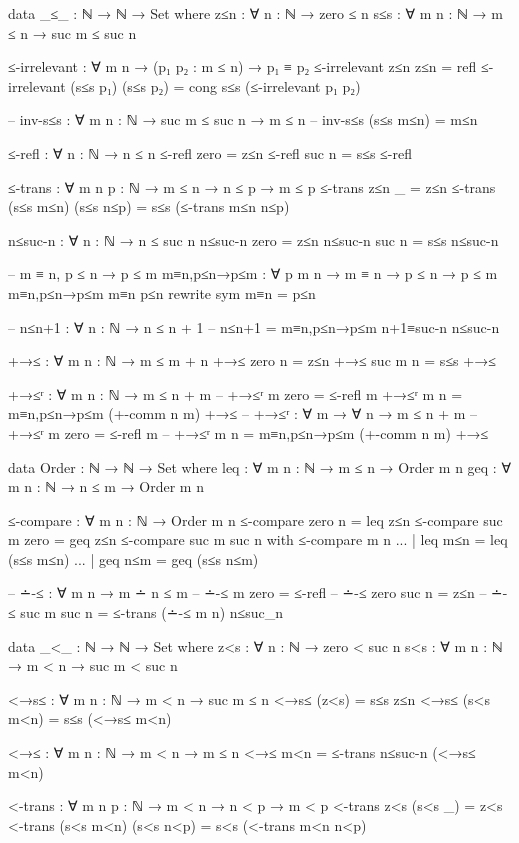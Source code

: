 \documentclass{article}
\begin{document}
\begin{prev}
\begin{code}
data _≤_ : ℕ → ℕ → Set where
    z≤n : ∀ {n : ℕ} → zero ≤ n
    s≤s : ∀ {m n : ℕ} → m ≤ n → suc m ≤ suc n

≤-irrelevant : ∀ {m n} → (p₁ p₂ : m ≤ n) → p₁ ≡ p₂
≤-irrelevant z≤n z≤n = refl
≤-irrelevant (s≤s p₁) (s≤s p₂) = cong s≤s (≤-irrelevant p₁ p₂)

-- inv-s≤s : ∀ {m n : ℕ} → suc m ≤ suc n → m ≤ n
-- inv-s≤s (s≤s m≤n) = m≤n

≤-refl : ∀ {n : ℕ} → n ≤ n
≤-refl {zero} = z≤n
≤-refl {suc n} = s≤s ≤-refl

≤-trans : ∀ {m n p : ℕ} → m ≤ n → n ≤ p → m ≤ p
≤-trans z≤n _ = z≤n
≤-trans (s≤s m≤n) (s≤s n≤p) = s≤s (≤-trans m≤n n≤p)

n≤suc-n : ∀ {n : ℕ} → n ≤ suc n
n≤suc-n {zero} = z≤n
n≤suc-n {suc n} = s≤s n≤suc-n

-- m ≡ n, p ≤ n → p ≤ m
m≡n,p≤n→p≤m : ∀ {p m n} → m ≡ n → p ≤ n → p ≤ m
m≡n,p≤n→p≤m m≡n p≤n rewrite sym m≡n = p≤n

-- n≤n+1 : ∀ {n : ℕ} → n ≤ n + 1
-- n≤n+1 = m≡n,p≤n→p≤m n+1≡suc-n n≤suc-n

+→≤ : ∀ {m n : ℕ} → m ≤ m + n
+→≤ {zero} {n} = z≤n
+→≤ {suc m} {n} = s≤s +→≤

+→≤ʳ : ∀ {m n : ℕ} → m ≤ n + m
-- +→≤ʳ {m} {zero} = ≤-refl {m}
+→≤ʳ {m} {n} = m≡n,p≤n→p≤m (+-comm {n} {m}) +→≤
-- +→≤ʳ : ∀ {m} → ∀ {n} → m ≤ n + m
-- +→≤ʳ {m} {zero} = ≤-refl {m}
-- +→≤ʳ {m} {n} = m≡n,p≤n→p≤m (+-comm {n} {m}) +→≤

data Order : ℕ → ℕ → Set where
    leq : ∀ {m n : ℕ} → m ≤ n → Order m n
    geq : ∀ {m n : ℕ} → n ≤ m → Order m n

≤-compare : ∀ {m n : ℕ} → Order m n
≤-compare {zero} {n} = leq z≤n
≤-compare {suc m} {zero} = geq z≤n
≤-compare {suc m} {suc n} with ≤-compare {m} {n}
... | leq m≤n = leq (s≤s m≤n)
... | geq n≤m = geq (s≤s n≤m)

-- ∸-≤ : ∀ {m n} → m ∸ n ≤ m
-- ∸-≤ {m} {zero} = ≤-refl
-- ∸-≤ {zero} {suc n} = z≤n
-- ∸-≤ {suc m} {suc n} = ≤-trans (∸-≤ {m} {n}) n≤suc_n

data _<_ : ℕ → ℕ → Set where
    z<s : ∀ {n : ℕ} → zero < suc n
    s<s : ∀ {m n : ℕ} → m < n → suc m < suc n

<→s≤ : ∀ {m n : ℕ} → m < n → suc m ≤ n
<→s≤ (z<s) = s≤s z≤n
<→s≤ (s<s m<n) = s≤s (<→s≤ m<n)

<→≤ : ∀ {m n : ℕ} → m < n → m ≤ n
<→≤ m<n = ≤-trans n≤suc-n (<→s≤ m<n)

<-trans : ∀ {m n p : ℕ} → m < n → n < p → m < p
<-trans z<s (s<s _) = z<s
<-trans (s<s m<n) (s<s n<p) = s<s (<-trans m<n n<p)


\end{code}
\end{prev}
\end{document}
